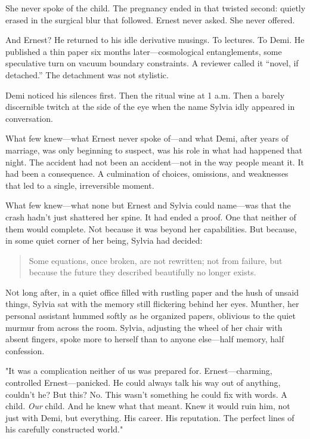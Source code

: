 \bigskip

She never spoke of the child. The pregnancy ended in that twisted second: quietly erased in the surgical blur that followed. Ernest never asked. She never offered.

\bigskip

And Ernest? He returned to his idle derivative musings. To lectures. To Demi. He published a thin paper six months later—cosmological entanglements, some speculative turn on vacuum boundary constraints. A reviewer called it “novel, if detached.” The detachment was not stylistic.

\bigskip

Demi noticed his silences first. Then the ritual wine at 1 a.m. Then a barely discernible twitch at the side of the eye when the name Sylvia idly appeared in conversation.


What few knew—what Ernest never spoke of—and what Demi, after years of marriage, was only beginning to suspect, was his role in what had happened that night. The accident had not been an accident—not in the way people meant it. It had been a consequence. A culmination of choices, omissions, and weaknesses that led to a single, irreversible moment.

What few knew—what none but Ernest and Sylvia could name—was that the crash hadn’t just shattered her spine. It had ended a proof. One that neither of them would complete. Not because it was beyond her capabilities. But because, in some quiet corner of her being, Sylvia had decided:  

\begin{quote}
Some equations, once broken, are not rewritten; not from failure, but because the future they  described beautifully no longer exists.
\end{quote}

\lettrine{N}ot long after, in a quiet office filled with rustling paper and the hush of unsaid things, Sylvia sat with the memory still flickering behind her eyes. Munther, her personal assistant hummed softly as he organized papers, oblivious to the quiet murmur from across the room. Sylvia, adjusting the wheel of her chair with absent fingers, spoke more to herself than to anyone else—half memory, half confession.


\bigskip

"It was a complication neither of us was prepared for. Ernest—charming, controlled Ernest—panicked. He could always talk his way out of anything, couldn’t he? But this? No. This wasn’t something he could fix with words. A child. \textit{Our} child. And he knew what that meant. Knew it would ruin him, not just with Demi, but everything. His career. His reputation. The perfect lines of his carefully constructed world."

